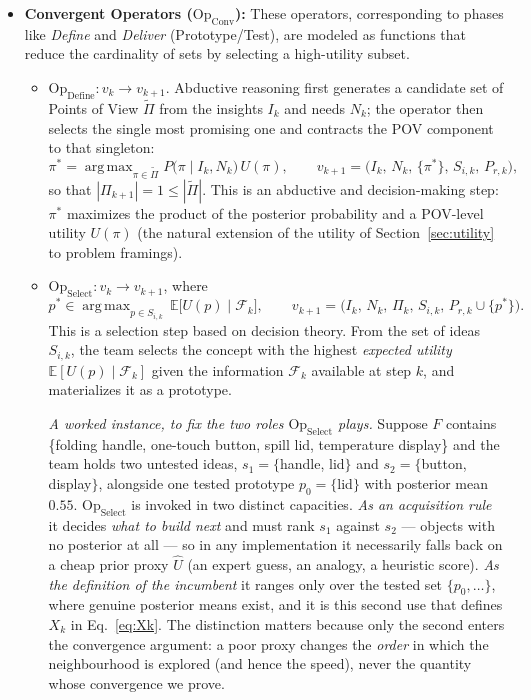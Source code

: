 \documentclass[11pt]{article}
\DeclareMathOperator*{\argmax}{arg\,max}
\newcommand{\E}{\mathbb{E}}
\newcommand{\filt}{\mathcal{F}}     %
\newcommand{\Op}[1]{\mathrm{Op}_{\mathrm{#1}}}
\begin{document}
\begin{itemize}
    \item \textbf{Convergent Operators ($\Op{Conv}$):} These operators, corresponding to phases like \textit{Define} and \textit{Deliver} (Prototype/Test), are modeled as functions that reduce the cardinality of sets by selecting a high-utility subset.
    \begin{itemize}
        \item $\Op{Define}: v_k \to v_{k+1}$. Abductive reasoning first generates a candidate set of Points of View $\widetilde{\Pi}$ from the insights $I_k$ and needs $N_k$; the operator then selects the single most promising one and contracts the POV component to that singleton:
\[
\pi^{*} = \argmax_{\pi \in \widetilde{\Pi}} P\!\big(\pi \mid I_k,N_k\big)\,U(\pi),
\qquad
v_{k+1} = \big(I_k,\, N_k,\, \{\pi^{*}\},\, S_{i,k},\, P_{r,k}\big),
\]
        so that $|\Pi_{k+1}| = 1 \le |\widetilde{\Pi}|$. This is an abductive and decision-making step: $\pi^{*}$ maximizes the product of the posterior probability and a POV-level utility $U(\pi)$ (the natural extension of the utility of Section~\ref{sec:utility} to problem framings).
        \item $\Op{Select}: v_k \to v_{k+1}$, where
\[
p^* \in \argmax_{p \in S_{i,k}} \,\E\!\big[U(p)\mid \filt_k\big],\qquad
v_{k+1} = \big(I_k,\, N_k,\, \Pi_{k},\, S_{i,k},\, P_{r,k} \cup \{p^*\}\big).
\]
This is a selection step based on decision theory. From the set of ideas $S_{i,k}$, the team selects the concept with the highest \textit{expected utility} $\E[U(p)\mid\filt_k]$ given the information $\filt_k$ available at step $k$, and materializes it as a prototype.

\emph{A worked instance, to fix the two roles $\Op{Select}$ plays.} Suppose $F$ contains \{folding handle, one-touch button, spill lid, temperature display\} and the team holds two untested ideas, $s_1=\{$handle, lid$\}$ and $s_2=\{$button, display$\}$, alongside one tested prototype $p_0=\{$lid$\}$ with posterior mean $0.55$. $\Op{Select}$ is invoked in two distinct capacities. \emph{As an acquisition rule} it decides \emph{what to build next} and must rank $s_1$ against $s_2$ --- objects with no posterior at all --- so in any implementation it necessarily falls back on a cheap prior proxy $\widehat U$ (an expert guess, an analogy, a heuristic score). \emph{As the definition of the incumbent} it ranges only over the tested set $\{p_0,\dots\}$, where genuine posterior means exist, and it is this second use that defines $X_k$ in Eq.~\eqref{eq:Xk}. The distinction matters because only the second enters the convergence argument: a poor proxy changes the \emph{order} in which the neighbourhood is explored (and hence the speed), never the quantity whose convergence we prove.
    \end{itemize}
\end{itemize}
\end{document}
